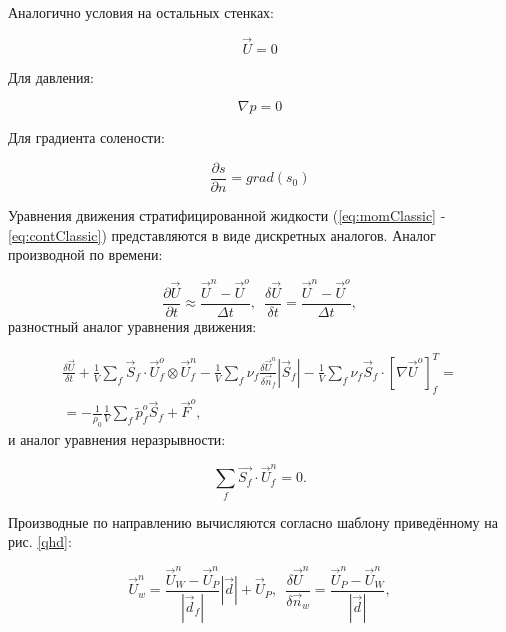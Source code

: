 Аналогично условия на остальных стенках:

\begin{equation}
    \vec{U} = 0
\end{equation}

Для давления:

\begin{equation}
    \nabla p = 0
\end{equation}

Для градиента солености:

\begin{equation}
    \frac{\partial s}{\partial n} = grad(s_0)
\end{equation}

Уравнения движения стратифицированной жидкости (\ref{eq:momClassic} - \ref{eq:contClassic}) представляются в виде дискретных аналогов. Аналог производной по времени:

\begin{equation}\label{eq:qhd_Euler}
    \frac{\partial \vec{U}}{\partial t} \approx \frac{ \vec{U}^n-\vec{U}^o}{\Delta t}, \,\,\,  \frac{\delta \vec{U}}{\delta t} =  \frac{ \vec{U}^n-\vec{U}^o}{\Delta t},
\end{equation}
разностный аналог уравнения движения:

\begin{multline}\label{eq:qhd_approx_momentum}
    \frac{\delta \vec{U}}{\delta t} + \frac{1}{V} \sum_f \vec{S}_f \cdot \vec{U}^o_f \otimes \vec{U}^n_f  - \frac{1}{V} \sum_f \nu_f \frac{\delta\vec{U}^n}{\delta \vec{n}_f} |\vec{S}_f| - \frac{1}{V} \sum_f \nu_f \vec{S}_f \cdot [\nabla \vec U^o]_f^T = \\
    = - \frac{1}{\rho_0} \frac{1}{V} \sum_f \tilde p^o_f \vec S_f + \vec{F}^o,
\end{multline}
и аналог уравнения неразрывности:

\begin{equation}
    \sum_f \vec{S_f} \cdot \vec{U}_f^n = 0.
\end{equation}

Производные по направлению вычисляются согласно шаблону приведённому на рис. \ref{qhd}:

\begin{equation}
    \vec{U}_w^n= \frac{\vec{U}_W^n-\vec{U}_P^n}{|\vec{d}_f|}|\vec{d}|+\vec{U}_P, \,\,\, \frac{\delta\vec{U}^n}{\delta \vec{n}_w} = \frac{\vec{U}^n_P-\vec{U}^n_W}{|\vec{d}|},
\end{equation}

